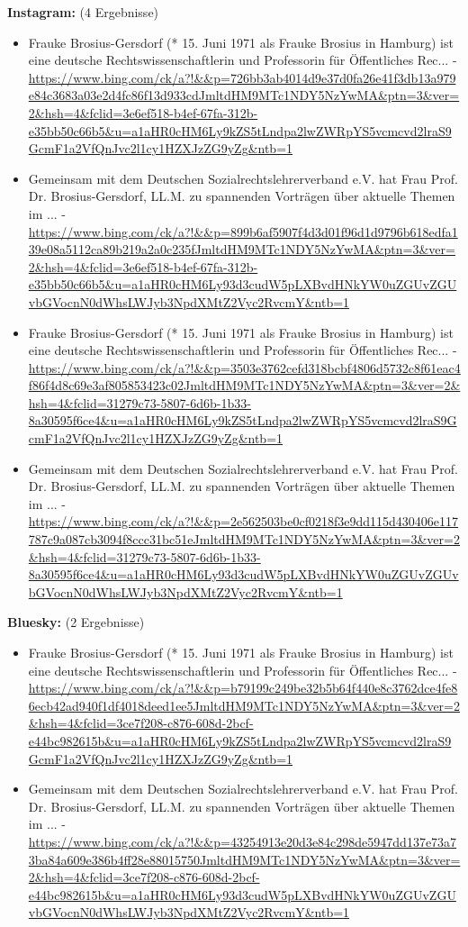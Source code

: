 \documentclass[12pt,a4paper]{article}
\begin{document}
\textbf{Instagram:} (4 Ergebnisse)
\begin{itemize}
\item Frauke Brosius-Gersdorf (* 15. Juni 1971 als Frauke Brosius in Hamburg) ist eine deutsche Rechtswissenschaftlerin und Professorin für Öffentliches Rec... - \url{https://www.bing.com/ck/a?!&&p=726bb3ab4014d9e37d0fa26e41f3db13a979e84c3683a03e2d4fc86f13d933cdJmltdHM9MTc1NDY5NzYwMA&ptn=3&ver=2&hsh=4&fclid=3e6ef518-b4ef-67fa-312b-e35bb50c66b5&u=a1aHR0cHM6Ly9kZS5tLndpa2lwZWRpYS5vcmcvd2lraS9GcmF1a2VfQnJvc2l1cy1HZXJzZG9yZg&ntb=1}
\item Gemeinsam mit dem Deutschen Sozialrechtslehrerverband e.V. hat Frau Prof. Dr. Brosius-Gersdorf, LL.M. zu spannenden Vorträgen über aktuelle Themen im ... - \url{https://www.bing.com/ck/a?!&&p=899b6af5907f4d3d01f96d1d9796b618edfa139e08a5112ca89b219a2a0c235fJmltdHM9MTc1NDY5NzYwMA&ptn=3&ver=2&hsh=4&fclid=3e6ef518-b4ef-67fa-312b-e35bb50c66b5&u=a1aHR0cHM6Ly93d3cudW5pLXBvdHNkYW0uZGUvZGUvbGVocnN0dWhsLWJyb3NpdXMtZ2Vyc2RvcmY&ntb=1}
\item Frauke Brosius-Gersdorf (* 15. Juni 1971 als Frauke Brosius in Hamburg) ist eine deutsche Rechtswissenschaftlerin und Professorin für Öffentliches Rec... - \url{https://www.bing.com/ck/a?!&&p=3503e3762cefd318bcbf4806d5732c8f61eac4f86f4d8c69e3af805853423c02JmltdHM9MTc1NDY5NzYwMA&ptn=3&ver=2&hsh=4&fclid=31279c73-5807-6d6b-1b33-8a30595f6ce4&u=a1aHR0cHM6Ly9kZS5tLndpa2lwZWRpYS5vcmcvd2lraS9GcmF1a2VfQnJvc2l1cy1HZXJzZG9yZg&ntb=1}
\item Gemeinsam mit dem Deutschen Sozialrechtslehrerverband e.V. hat Frau Prof. Dr. Brosius-Gersdorf, LL.M. zu spannenden Vorträgen über aktuelle Themen im ... - \url{https://www.bing.com/ck/a?!&&p=2e562503be0cf0218f3e9dd115d430406e117787c9a087cb3094f8ccc31bc51eJmltdHM9MTc1NDY5NzYwMA&ptn=3&ver=2&hsh=4&fclid=31279c73-5807-6d6b-1b33-8a30595f6ce4&u=a1aHR0cHM6Ly93d3cudW5pLXBvdHNkYW0uZGUvZGUvbGVocnN0dWhsLWJyb3NpdXMtZ2Vyc2RvcmY&ntb=1}
\end{itemize}

\textbf{Bluesky:} (2 Ergebnisse)
\begin{itemize}
\item Frauke Brosius-Gersdorf (* 15. Juni 1971 als Frauke Brosius in Hamburg) ist eine deutsche Rechtswissenschaftlerin und Professorin für Öffentliches Rec... - \url{https://www.bing.com/ck/a?!&&p=b79199c249be32b5b64f440e8c3762dce4fe86ecb42ad940f1df4018deed1ee5JmltdHM9MTc1NDY5NzYwMA&ptn=3&ver=2&hsh=4&fclid=3ce7f208-c876-608d-2bcf-e44bc982615b&u=a1aHR0cHM6Ly9kZS5tLndpa2lwZWRpYS5vcmcvd2lraS9GcmF1a2VfQnJvc2l1cy1HZXJzZG9yZg&ntb=1}
\item Gemeinsam mit dem Deutschen Sozialrechtslehrerverband e.V. hat Frau Prof. Dr. Brosius-Gersdorf, LL.M. zu spannenden Vorträgen über aktuelle Themen im ... - \url{https://www.bing.com/ck/a?!&&p=43254913e20d3e84c298de5947dd137e73a73ba84a609e386b4ff28e88015750JmltdHM9MTc1NDY5NzYwMA&ptn=3&ver=2&hsh=4&fclid=3ce7f208-c876-608d-2bcf-e44bc982615b&u=a1aHR0cHM6Ly93d3cudW5pLXBvdHNkYW0uZGUvZGUvbGVocnN0dWhsLWJyb3NpdXMtZ2Vyc2RvcmY&ntb=1}
\end{itemize}
\end{document}
